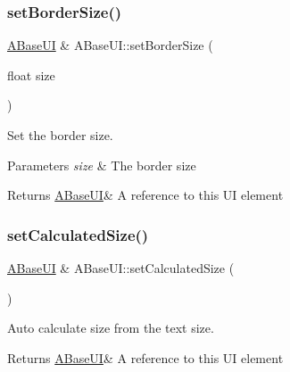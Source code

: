 \subsubsection{\texorpdfstring{set\+Border\+Size()}{setBorderSize()}}
{\footnotesize\ttfamily \hyperlink{class_a_base_u_i}{A\+Base\+UI} \& A\+Base\+U\+I\+::set\+Border\+Size (\begin{DoxyParamCaption}\item[{float}]{size }\end{DoxyParamCaption})\hspace{0.3cm}{\ttfamily [virtual]}}



Set the border size. 


\begin{DoxyParams}{Parameters}
{\em size} & The border size \\
\hline
\end{DoxyParams}
\begin{DoxyReturn}{Returns}
\hyperlink{class_a_base_u_i}{A\+Base\+UI}\& A reference to this UI element 
\end{DoxyReturn}
\mbox{\label{class_a_base_u_i_aad292aed7bb28a2c8654ddfb54596a2c}} 
\subsubsection{\texorpdfstring{set\+Calculated\+Size()}{setCalculatedSize()}}
{\footnotesize\ttfamily \hyperlink{class_a_base_u_i}{A\+Base\+UI} \& A\+Base\+U\+I\+::set\+Calculated\+Size (\begin{DoxyParamCaption}{ }\end{DoxyParamCaption})\hspace{0.3cm}{\ttfamily [virtual]}}



Auto calculate size from the text size. 

\begin{DoxyReturn}{Returns}
\hyperlink{class_a_base_u_i}{A\+Base\+UI}\& A reference to this UI element 
\end{DoxyReturn}
\mbox{\label{class_a_base_u_i_a13a7acc1e7ffa2c139c74e841d744753}} 

